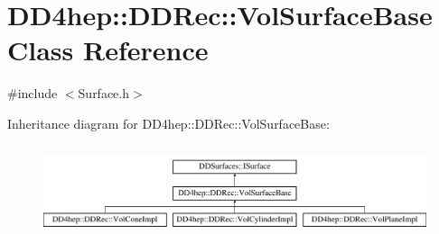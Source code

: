 \hypertarget{class_d_d4hep_1_1_d_d_rec_1_1_vol_surface_base}{}\section{D\+D4hep\+:\+:D\+D\+Rec\+:\+:Vol\+Surface\+Base Class Reference}
\label{class_d_d4hep_1_1_d_d_rec_1_1_vol_surface_base}


{\ttfamily \#include $<$Surface.\+h$>$}

Inheritance diagram for D\+D4hep\+:\+:D\+D\+Rec\+:\+:Vol\+Surface\+Base\+:\begin{figure}[H]
\begin{center}
\leavevmode
\includegraphics[height=2.666667cm]{class_d_d4hep_1_1_d_d_rec_1_1_vol_surface_base}
\end{center}
\end{figure}
